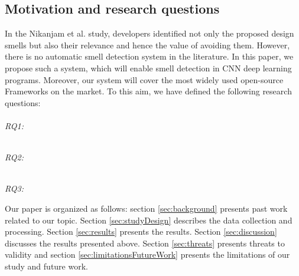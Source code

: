 \subsection{Motivation and research questions}
In the Nikanjam et al. study, developers identified not only the proposed design smells but also their relevance and hence the value of avoiding them. However, there is no automatic smell detection system in the literature. In this paper, we propose such a system, which will enable smell detection in CNN deep learning programs. Moreover, our system will cover the most widely used open-source Frameworks on the market. To this aim, we have defined the following research questions:\\

\emph{\\RQ1:\RQOne} %

\emph{\\RQ2:\RQTwo} %

\emph{\\RQ3:\RQThree} %

Our paper is organized as follows: section \ref{sec:background} presents past work related to our topic. Section \ref{sec:studyDesign} describes the data collection and processing. Section \ref{sec:results} presents the results. Section \ref{sec:discussion} discusses the results presented above. Section \ref{sec:threats} presents threats to validity and section \ref{sec:limitationsFutureWork} presents the limitations of our study and future work.
